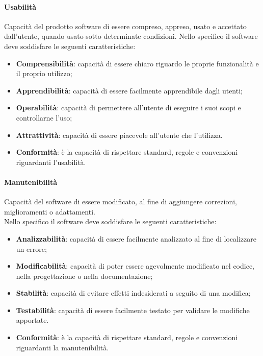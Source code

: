 		\paragraph{Usabilità}
		Capacità del prodotto software di essere compreso, appreso, usato e accettato dall'utente, quando usato sotto determinate condizioni.\newline
		Nello specifico il software deve soddisfare le seguenti caratteristiche:
		\begin{itemize}
			\item \textbf{Comprensibilità}: capacità di essere chiaro riguardo le proprie funzionalità e il proprio utilizzo;
			\item \textbf{Apprendibilità}: capacità di essere facilmente apprendibile dagli utenti;
			\item \textbf{Operabilità}: capacità di permettere all'utente di eseguire i suoi scopi e controllarne l'uso;
			\item \textbf{Attrattività}: capacità di essere piacevole all'utente che l'utilizza.
			\item \textbf{Conformità}: è la capacità di rispettare standard, regole e convenzioni riguardanti l'usabilità.
		\end{itemize}
		\paragraph{Manutenibilità}
		Capacità del software di essere modificato, al fine di aggiungere correzioni, miglioramenti o adattamenti.\\
		Nello specifico il software deve soddisfare le seguenti caratteristiche:
		\begin{itemize}
			\item \textbf{Analizzabilità}: capacità di essere facilmente analizzato al fine di localizzare un errore;
			\item \textbf{Modificabilità}: capacità di poter essere agevolmente modificato nel codice, nella progettazione o nella documentazione;
			\item \textbf{Stabilità}: capacità di evitare effetti indesiderati a seguito di una modifica;
			\item \textbf{Testabilità}: capacità di essere facilmente testato per validare le modifiche apportate.
			\item \textbf{Conformità}: è la capacità di rispettare standard, regole e convenzioni riguardanti la manutenibilità.
		\end{itemize}
